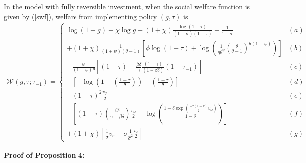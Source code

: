 \documentclass{article}
\newenvironment{customthm}[1]
  {\renewcommand\theinnercustomthm{#1}\innercustomthm}
  {\endinnercustomthm}
\begin{document}
\begin{customthm}{4}\label{prop4}
In the model with fully reversible investment, when the social welfare function is given by (\ref{swf}), welfare from implementing policy $(g, \tau)$ is
\begin{align}
\mathcal{W}(g, \tau; \tau_{-1}) =
\begin{cases}
\log(1-g) + \chi \log g + (1+\chi) \frac{\log(1-\tau)}{(1+\hat\sigma)(1-\tau)}- \frac{1}{1+\hat\sigma} 
& (a)\\
+(1+\chi)\frac{1}{(1+\psi)(\theta-1)} [ \phi \log(1-\tau) + \log ( \frac{1}{\eta\theta^\psi} ( \frac{\theta}{\theta - 1} )^{\theta(1+\psi)} ) ]
& (b)\\
-\frac{\psi}{(1+\psi)\theta} [ (1-\tau) - \frac{\beta\delta}{\gamma} \frac{(1-\gamma)}{(1-\beta\delta)}(1-\tau_{-1}) ]
& (c)\\
-[ - \log(1-(\frac{1-\tau}{\theta})) - (\frac{1-\tau}{\theta}) ]
& (d)\\
-(1-\tau)^2\frac{v_\varphi}{2}
& (e)\\
-[(1-\tau)(\frac{\beta\delta}{\gamma - \beta\delta})\frac{v_{\omega}}{2} - \log(\frac{1-\delta \exp(\frac{-\tau(1-\tau)}{2}v_\omega)}{1-\delta})]
& (f)\\
+ (1 + \chi) [\frac{1}{\hat\sigma} v_\varepsilon - \sigma \frac{1}{\hat \sigma^2}\frac{v_\varepsilon}{2}]
& (g)
\end{cases}
\label{cf_swf}
\end{align}
\end{customthm}

\bigskip

\textbf{Proof of Proposition 4:}
\end{document}
